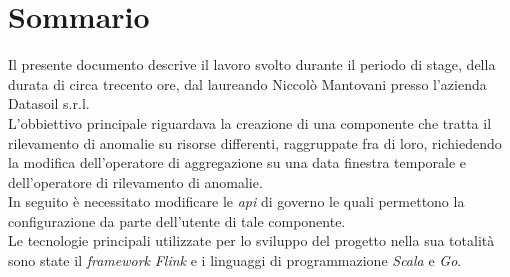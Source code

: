 
\cleardoublepage
{}
{}
\begingroup
\let\clearpage\relax
\let\cleardoublepage\relax
\let\cleardoublepage\relax

\chapter*{Sommario}

Il presente documento descrive il lavoro svolto durante il periodo di stage, della durata di circa trecento ore, dal laureando Niccolò Mantovani presso l'azienda Datasoil s.r.l.\\
L'obbiettivo principale riguardava la creazione di una componente che tratta il rilevamento di anomalie su risorse differenti, raggruppate fra di loro, richiedendo la modifica dell'operatore di aggregazione su una data finestra temporale e dell'operatore di rilevamento di anomalie.\\
In seguito è necessitato modificare le \textit{\gls{api}} di governo le quali permettono la configurazione da parte dell'utente di tale componente.\\
Le tecnologie principali utilizzate per lo sviluppo del progetto nella sua totalità sono state il \textit{\textit{\gls{framework}}} \textit{Flink} e i linguaggi di programmazione \textit{Scala} e \textit{Go}.

%
%

\endgroup			

\vfill

